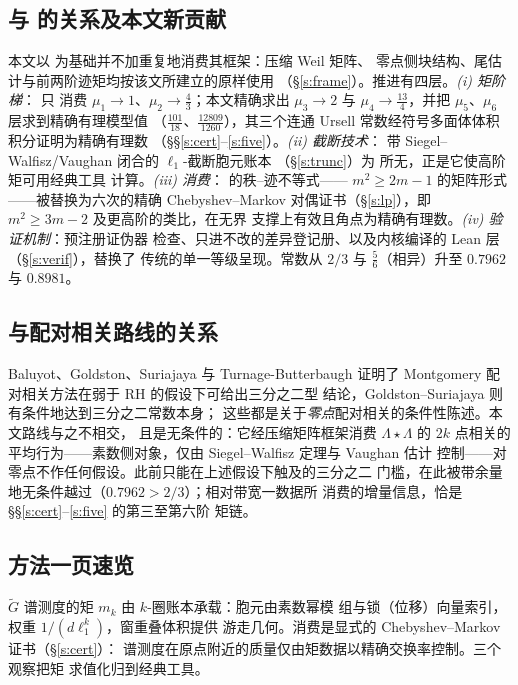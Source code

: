 \documentclass[11pt]{article}
\numberwithin{equation}{section}
\theoremstyle{definition}
\theoremstyle{remark}
\newcommand{\LL}{\Lambda}
\begin{document}
\subsection*{与 \cite{C26} 的关系及本文新贡献}

本文以 \cite{C26} 为基础并不加重复地消费其框架：压缩 Weil 矩阵、
零点侧块结构、尾估计与前两阶迹矩均按该文所建立的原样使用
（\S\ref{s:frame}）。推进有四层。\emph{(i) 矩阶梯}：\cite{C26} 只
消费 $\mu_1\to1$、$\mu_2\to\tfrac43$；本文精确求出 $\mu_3\to2$ 与
$\mu_4\to\tfrac{13}4$，并把 $\mu_5$、$\mu_6$ 层求到精确有理模型值
（$\tfrac{101}{18}$、$\tfrac{12809}{1260}$），其三个连通 Ursell
常数经符号多面体体积积分证明为精确有理数
（\S\S\ref{s:cert}--\ref{s:five}）。\emph{(ii) 截断技术}：
带 Siegel--Walfisz/Vaughan 闭合的 $\ell_1$-截断胞元账本
（\S\ref{s:trunc}）为 \cite{C26} 所无，正是它使高阶矩可用经典工具
计算。\emph{(iii) 消费}：\cite[引理~3.2]{C26} 的秩--迹不等式——
$m^{2}\ge2m-1$ 的矩阵形式——被替换为六次的精确 Chebyshev--Markov
对偶证书（\S\ref{s:lp}），即 $m^{2}\ge3m-2$ 及更高阶的类比，在无界
支撑上有效且角点为精确有理数。\emph{(iv) 验证机制}：预注册证伪器
检查、只进不改的差异登记册、以及内核编译的 Lean 层
（\S\ref{s:verif}），替换了 \cite{C26} 传统的单一等级呈现。常数从
$2/3$ 与 $\tfrac56$（相异）升至 $0.7962$ 与 $0.8981$。

\subsection*{与配对相关路线的关系}

Baluyot、Goldston、Suriajaya 与 Turnage-Butterbaugh \cite{BGST}
证明了 Montgomery 配对相关方法在弱于 RH 的假设下可给出三分之二型
结论，Goldston--Suriajaya \cite{GS} 则有条件地达到三分之二常数本身；
这些都是关于\emph{零点}配对相关的条件性陈述。本文路线与之不相交，
且是无条件的：它经压缩矩阵框架消费 $\LL\star\LL$ 的 $2k$ 点相关的
平均行为——素数侧对象，仅由 Siegel--Walfisz 定理与 Vaughan 估计
控制——对零点不作任何假设。此前只能在上述假设下触及的三分之二
门槛，在此被带余量地无条件越过（$0.7962>2/3$）；相对带宽一数据所
消费的增量信息，恰是 \S\S\ref{s:cert}--\ref{s:five} 的第三至第六阶
矩链。

\subsection*{方法一页速览}

$\widetilde G$ 谱测度的矩 $m_k$ 由 $k$-圈账本承载：胞元由素数幂模
组与锁（位移）向量索引，权重 $1/(d\ell_1^{k})$，窗重叠体积提供
游走几何。消费是显式的 Chebyshev--Markov 证书（\S\ref{s:cert}）：
谱测度在原点附近的质量仅由矩数据以精确交换率控制。三个观察把矩
求值化归到经典工具。
\end{document}
